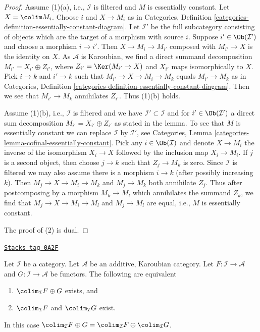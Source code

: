 \begin{proof}
Assume (1)(a), i.e., $\mathcal{I}$ is filtered and $M$ is essentially
constant. Let $X = \colim M_i$. Choose $i$ and $X \to M_i$ as in
Categories, Definition
\ref{categories-definition-essentially-constant-diagram}.
Let $\mathcal{I}'$ be the full subcategory consisting of objects
which are the target of a morphism with source $i$.
Suppose $i' \in \Ob(\mathcal{I}')$ and choose a morphism $i \to i'$.
Then $X \to M_i \to M_{i'}$ composed with $M_{i'} \to X$ is the identity
on $X$. As $\mathcal{A}$ is Karoubian, we find a direct summand
decomposition $M_{i'} = X_{i'} \oplus Z_{i'}$, where
$Z_{i'} = \Ker(M_{i'} \to X)$ and $X_{i'}$ maps isomorphically to $X$.
Pick $i \to k$ and $i' \to k$ such that $M_{i'} \to X \to M_i \to M_k$
equals $M_{i'} \to M_k$ as in Categories, Definition
\ref{categories-definition-essentially-constant-diagram}.
Then we see that $M_{i'} \to M_k$ annihilates $Z_{i'}$.
Thus (1)(b) holds.

\medskip\noindent
Assume (1)(b), i.e., $\mathcal{I}$ is filtered and we have
$\mathcal{I}' \subset \mathcal{I}$ and for $i' \in \Ob(\mathcal{I}')$
a direct sum decomposition $M_{i'} = X_{i'} \oplus Z_{i'}$
as stated in the lemma. To see that $M$ is essentially constant
we can replace $\mathcal{I}$ by $\mathcal{I}'$, see
Categories, Lemma \ref{categories-lemma-cofinal-essentially-constant}.
Pick any $i \in \Ob(\mathcal{I})$
and denote $X \to M_i$ the inverse of the isomorphism $X_i \to X$
followed by the inclusion map $X_i \to M_i$. If $j$ is
a second object, then choose $j \to k$ such that $Z_j \to M_k$ is
zero. Since $\mathcal{I}$ is filtered we may also assume there is
a morphism $i \to k$ (after possibly increasing $k$). Then
$M_j \to X \to M_i \to M_k$ and $M_j \to M_k$ both annihilate $Z_j$.
Thus after postcomposing by a morphism $M_k \to M_l$ which annihilates
the summand $Z_k$, we find that $M_j \to X \to M_i \to M_l$ and
$M_j \to M_l$ are equal, i.e., $M$ is essentially constant.

\medskip\noindent
The proof of (2) is dual.
\end{proof}

\begin{lemma}
\label{homology-lemma-direct-sum-from-product-colimit}
\href{https://stacks.math.columbia.edu/tag/0A2F}{\texttt{Stacks tag 0A2F}}

Let $\mathcal{I}$ be a category. Let $\mathcal{A}$ be an additive, Karoubian
category. Let $F : \mathcal{I} \to \mathcal{A}$ and
$G : \mathcal{I} \to \mathcal{A}$ be functors. The following are equivalent
\begin{enumerate}
\item $\colim_\mathcal{I} F \oplus G$ exists, and
\item $\colim_\mathcal{I} F$ and $\colim_\mathcal{I} G$ exist.
\end{enumerate}
In this case $\colim_\mathcal{I} F \oplus G =
\colim_\mathcal{I} F \oplus \colim_\mathcal{I} G$.
\end{lemma}

